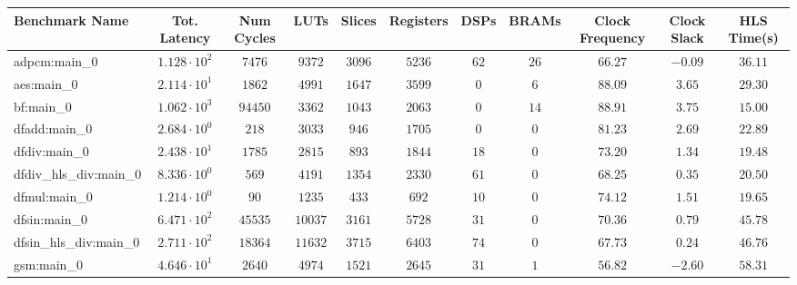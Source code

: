 \begin{tabular}{|l|c|c|c|c|c|c|c|c|c|c|}
\hline
Benchmark Name          & Tot. Latency           & Num Cycles & LUTs      & Slices    & Registers & DSPs    & BRAMs  & Clock Frequency & Clock Slack & HLS Time(s) \\
\hline
adpcm:main\_0           & $ 1.128 \cdot 10^{2} $ & $ 7476   $ & $ 9372  $ & $ 3096  $ & $ 5236  $ & $ 62  $ & $ 26 $ & $ 66.27       $ & $ -0.09   $ & $ 36.11   $ \\
aes:main\_0             & $ 2.114 \cdot 10^{1} $ & $ 1862   $ & $ 4991  $ & $ 1647  $ & $ 3599  $ & $ 0   $ & $ 6  $ & $ 88.09       $ & $ 3.65    $ & $ 29.30   $ \\
bf:main\_0              & $ 1.062 \cdot 10^{3} $ & $ 94450  $ & $ 3362  $ & $ 1043  $ & $ 2063  $ & $ 0   $ & $ 14 $ & $ 88.91       $ & $ 3.75    $ & $ 15.00   $ \\
dfadd:main\_0           & $ 2.684 \cdot 10^{0} $ & $ 218    $ & $ 3033  $ & $ 946   $ & $ 1705  $ & $ 0   $ & $ 0  $ & $ 81.23       $ & $ 2.69    $ & $ 22.89   $ \\
dfdiv:main\_0           & $ 2.438 \cdot 10^{1} $ & $ 1785   $ & $ 2815  $ & $ 893   $ & $ 1844  $ & $ 18  $ & $ 0  $ & $ 73.20       $ & $ 1.34    $ & $ 19.48   $ \\
dfdiv\_hls\_div:main\_0 & $ 8.336 \cdot 10^{0} $ & $ 569    $ & $ 4191  $ & $ 1354  $ & $ 2330  $ & $ 61  $ & $ 0  $ & $ 68.25       $ & $ 0.35    $ & $ 20.50   $ \\
dfmul:main\_0           & $ 1.214 \cdot 10^{0} $ & $ 90     $ & $ 1235  $ & $ 433   $ & $ 692   $ & $ 10  $ & $ 0  $ & $ 74.12       $ & $ 1.51    $ & $ 19.65   $ \\
dfsin:main\_0           & $ 6.471 \cdot 10^{2} $ & $ 45535  $ & $ 10037 $ & $ 3161  $ & $ 5728  $ & $ 31  $ & $ 0  $ & $ 70.36       $ & $ 0.79    $ & $ 45.78   $ \\
dfsin\_hls\_div:main\_0 & $ 2.711 \cdot 10^{2} $ & $ 18364  $ & $ 11632 $ & $ 3715  $ & $ 6403  $ & $ 74  $ & $ 0  $ & $ 67.73       $ & $ 0.24    $ & $ 46.76   $ \\
gsm:main\_0             & $ 4.646 \cdot 10^{1} $ & $ 2640   $ & $ 4974  $ & $ 1521  $ & $ 2645  $ & $ 31  $ & $ 1  $ & $ 56.82       $ & $ -2.60   $ & $ 58.31   $ \\

\end{tabular}
